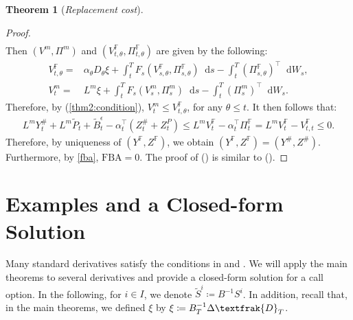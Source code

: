 \documentclass[a4paper, 11pt]{article}              %
\numberwithin{equation}{section}
\theoremstyle{plain}
\newcommand{\1}{\mathds{1}}
\newcommand{\frD}{\textfrak{D}}
\newcommand{\Bt}{\tilde{B}}
\newcommand{\St}{\tilde{S}}
\newcommand{\pt}{\tilde{P}}
\newcommand{\dsF}{\mathbb{F}}
\theoremstyle{plain}
\newtheorem{theorem}[thm]{Theorem}
\theoremstyle{definition}
\newtheorem{theorem}{Theorem}
\theoremstyle{plain}
\newcommand*\df{\mathop{}\!\mathrm{d}}
\newcommand{\rom}[1]{\lowercase\expandafter{\romannumeral #1\relax}}
\begin{document}
\begin{theorem}[\textit{Replacement cost}]
\begin{proof}
\begin{eqnarray}
\end{eqnarray}
Then $(V^m, \Pi^m)$ and $(V^\dsF_{t, \theta}, \Pi^\dsF_{t, \theta})$ are given by the following:
\begin{align}
  V^\dsF_{t, \theta} =& \alpha _\theta D_\theta \xi+\int_{t}^{T}F_s(V^\dsF_{s,
                   \theta},\Pi^\dsF_{s,\theta}) \df s - \int_{t}^{T}(\Pi^\dsF_{s,\theta})^\top\df W_s,
                   \nonumber \\
  V^m_{t} =& L^m \xi+\int_{t}^{T}F_s(V^m_s, \Pi^m_s) \df s - \int_{t}^{T}(\Pi^m_s)^\top\df
             W_s. \nonumber 
\end{align}
Therefore, by (\ref{thm2:condition}), $V^m_t \leq V^\dsF_{t, \theta}$, for any $\theta \leq
t$. It then follows that:
\begin{align}
  L^mY^\#_t+L^m\pt_t +\Bt^\epsilon_t- \alpha^\top_t(Z^\#_t+Z^P_t) 
  \leq  L^mV^\dsF_t - \alpha^\top_t\Pi^\dsF_t =L^mV^\dsF_t - V^\dsF_{t, t} \leq0.\nonumber 
\end{align}
Therefore, by uniqueness of $(Y^\dsF, Z^\dsF)$, we obtain $(Y^\dsF, Z^\dsF)=(Y^\#,
Z^\#)$. Furthermore, by \cref{fba}, $\text{FBA}=0$. The proof of (\rom{2}) is 
similar to (\rom{1}). 
\end{proof}
\end{theorem}

\iffalse
\begin{align}
  Y^{\#\#}_t
  =& \int_{t}^{u}B^{-1}_s\df \frD_s+\int_{t}^{u} -\bigg[\big(L^m_sY^{\#\#}_s - \alpha_s^\top Z^{\#\#}_s\big)s^{b}_s
     +h^H_sL^HL^m_sY^{\#\#}_s\bigg]\df s
    -\int_{t}^{u}Z^{\#\#}_s\df W_s     
\end{align}
If $\frD = \1_{U \leq t}\xi^U + \1_{T \leq t}\xi^T$, then for $t \in [0, U)$,
\begin{align}
    Y^{\#\#}_t
  =& \xi^U +\int_{t}^{U} -\bigg[\big(L^m_sY^{\#\#}_s - \alpha_s^\top Z^{\#\#}_s\big)s^{b}_s
     +h^H_sL^HL^m_sY^{\#\#}_s\bigg]\df s
    -\int_{t}^{U}Z^{\#\#}_s\df W_s,
\end{align}
while for $t \in (U, T)$,
\begin{align}
   Y^{\#\#}_t
  =& \xi^U +\xi^T+\int_{t}^{T} -\bigg[\big(L^m_sY^{\#\#}_s - \alpha_s^\top Z^{\#\#}_s\big)s^{b}_s
     +h^H_sL^HL^m_sY^{\#\#}_s\bigg]\df s
    -\int_{t}^{T}Z^{\#\#}_s\df W_s,
\end{align}
\fi

\section{Examples and a Closed-form Solution}
\label{sec:example}
Many standard derivatives satisfy the conditions in  and
. We will apply the main theorems to  several derivatives
and provide a closed-form solution for a call option. In the following, for
$i \in I$, we denote
 $\St^i \coloneqq B^{-1}S^i$. 
In addition, recall that, in the main theorems, we defined $\xi$ by
$  \xi\coloneqq B_T^{-1}\Delta\frD_T$. 
\end{document}
